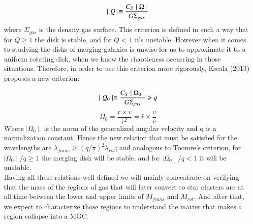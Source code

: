 \documentclass{aa}
\begin{document}
   \begin{equation}
        \mid Q \mid \equiv \frac{C_S \mid \Omega \mid}{G \Sigma_{gas}} 
   \centering
   \end{equation}
   where $\Sigma_{gas}$ is the density gas surface. This criterion is defined in such a way that for $Q \geqslant 1$ the disk is stable, and for $Q < 1$ it's unstable. However when it comes to studying the disks of merging galaxies is unwise for us to approximate it to a uniform rotating disk, when we know the chaoticness occurring in those situations. Therefore, in order to use this criterion more rigorously, Escala (2013) proposes a new criterion: 
   

   \begin{equation}
        \mid Q_0 \mid \equiv \frac{C_S \mid \Omega_{0} \mid}{G \Sigma_{gas}} \geqslant q
   \centering
   \end{equation}
   \begin{equation}
       \Omega_{0} = \frac{r \times v }{r^2} = \hat{r} \times \frac{v}{r}
   \end{equation}
   Where  $\mid\Omega_0\mid$ is the norm of the generalized angular velocity and q is a normalization constant. Hence the new relation that must be satisfied for the wavelengths are $\lambda_{jeans} \geqslant (q/\pi)^2 \lambda_{rot}$; and analogous to Toomre's criterion, for $\mid \Omega_0 \mid / q  \geqslant 1$ the merging disk will be stable, and for $\mid \Omega_0 \mid / q  < 1$ it will be unstable.\\
   Having all these relations well defined we will mainly concentrate on verifying that the mass of the regions of gas that will later convert to star clusters are at all time between the lower and upper limits of $M_{jeans}$ and $M_{rot}$. And after that, we expect to characterize those regions to understand the matter that makes a region collapse into a MGC. 
   
\end{document}
